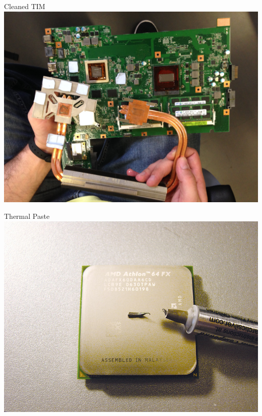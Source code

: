 \documentclass{beamer}
\begin{document}
\begin{frame}{Cleaned TIM}
    \centering
    \includegraphics[scale=0.08]{cleaned-tim}
\end{frame}

\begin{frame}{Thermal Paste}
    \centering
    \includegraphics[scale=0.9]{tim-desktop-cpu}
\end{frame}
\end{document}
